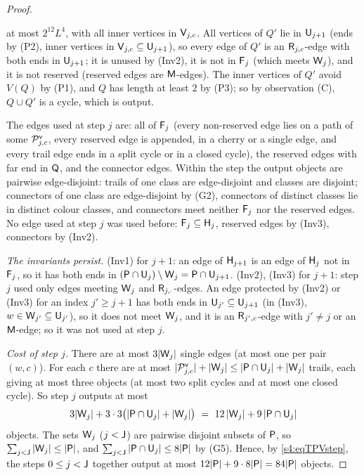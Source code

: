 \begin{proof}
\begin{itemize}
  at most $2^{12}L^4$, with all inner vertices in $\mathsf{V}_{j,c}$. All vertices of $Q'$ lie in $\mathsf{U}_{j+1}$ (ends by (P2),
  inner vertices in $\mathsf{V}_{j,c}\subseteq\mathsf{U}_{j+1}$), so every edge of $Q'$ is an $\mathsf{R}_{j,c}$-edge with both ends in
  $\mathsf{U}_{j+1}$; it is unused by (Inv2), it is not in $\mathsf{F}_j$ (which meets $\mathsf{W}_j$), and it is not reserved (reserved
  edges are $\mathsf{M}$-edges). The inner vertices of $Q'$ avoid $V(Q)$ by (P1), and $Q$ has length at least $2$ by (P3);
  so by observation \textup{(C)}, $Q\cup Q'$ is a cycle, which is output.
\end{itemize}
The edges used at step $j$ are: all of $\mathsf{F}_j$ (every non-reserved edge lies on a path of some $\mathcal{P}^{\mathsf{v}}_{j,c}$,
every reserved edge is appended, in a cherry or a single edge, and every trail edge ends in a split cycle or in a
closed cycle), the reserved edges with far end in $\mathsf{Q}$, and the connector edges. Within the step the output objects
are pairwise edge-disjoint: trails of one class are edge-disjoint and classes are disjoint; connectors of one class
are edge-disjoint by (G2), connectors of distinct classes lie in distinct colour classes, and connectors meet neither
$\mathsf{F}_j$ nor the reserved edges. No edge used at step $j$ was used before: $\mathsf{F}_j\subseteq\mathsf{H}_j$, reserved edges by
(Inv3), connectors by (Inv2).

\emph{The invariants persist.} (Inv1) for $j+1$: an edge of $\mathsf{H}_{j+1}$ is an edge of $\mathsf{H}_j$ not in $\mathsf{F}_j$, so it
has both ends in $(\mathsf{P}\cap\mathsf{U}_j)\setminus\mathsf{W}_j=\mathsf{P}\cap\mathsf{U}_{j+1}$. (Inv2), (Inv3) for $j+1$: step $j$ used only edges
meeting $\mathsf{W}_j$ and $\mathsf{R}_{j,\cdot}$-edges. An edge protected by (Inv2) or (Inv3) for an index $j'\ge j+1$ has both
ends in $\mathsf{U}_{j'}\subseteq\mathsf{U}_{j+1}$ (in (Inv3), $w\in\mathsf{W}_{j'}\subseteq\mathsf{U}_{j'}$), so it does not meet $\mathsf{W}_j$, and
it is an $\mathsf{R}_{j',c}$-edge with $j'\ne j$ or an $\mathsf{M}$-edge; so it was not used at step $j$.

\emph{Cost of step $j$.} There are at most $3|\mathsf{W}_j|$ single edges (at most one per pair $(w,c)$). For each $c$ there
are at most $|\mathcal{P}^{\mathsf{v}}_{j,c}|+|\mathsf{W}_j|\le|\mathsf{P}\cap\mathsf{U}_j|+|\mathsf{W}_j|$ trails, each giving at most three objects (at most two
split cycles and at most one closed cycle). So step $j$ outputs at most
\begin{equation}\label{s4:eqTPVstep}
3|\vW_j|+3\cdot3\bigl(|\vP\cap\vU_j|+|\vW_j|\bigr)\ =\ 12\,|\vW_j|+9\,|\vP\cap\vU_j|
\end{equation}
objects. The sets $\mathsf{W}_j$ ($j<\mathsf{J}$) are pairwise disjoint subsets of $\mathsf{P}$, so $\sum_{j<\mathsf{J}}|\mathsf{W}_j|\le|\mathsf{P}|$, and
$\sum_{j<\mathsf{J}}|\mathsf{P}\cap\mathsf{U}_j|\le8|\mathsf{P}|$ by (G5). Hence, by \eqref{s4:eqTPVstep}, the steps $0\le j<\mathsf{J}$ together
output at most $12|\mathsf{P}|+9\cdot8|\mathsf{P}|=84|\mathsf{P}|$ objects.


\end{proof}
